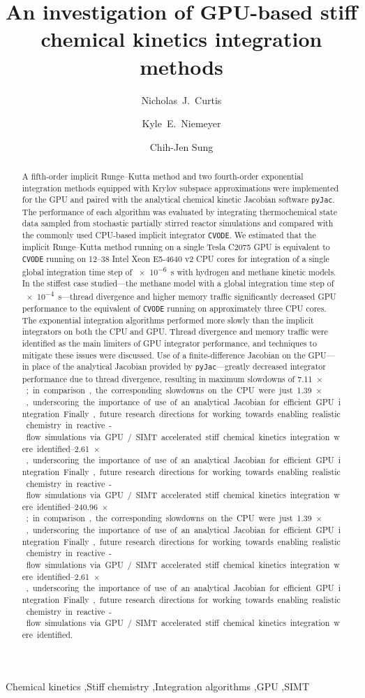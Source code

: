 \documentclass[preprint,review,11pt]{elsarticle}
\begin{document}
\begin{frontmatter}

\title{An investigation of GPU-based stiff chemical kinetics integration methods}

\author[uconn]{Nicholas~J.\ Curtis}
\author[osu]{Kyle~E.\ Niemeyer}
\author[uconn]{Chih-Jen Sung}

\address[uconn]{Department of Mechanical Engineering\\
  University of Connecticut, Storrs, CT 06269, USA}
\address[osu]{School of Mechanical, Industrial, and Manufacturing Engineering\\
  Oregon State University, Corvallis, OR 97331, USA}


\begin{abstract}
A fifth-order implicit Runge--Kutta method and two fourth-order exponential integration methods equipped with Krylov subspace approximations were implemented for the GPU and paired with the analytical chemical kinetic Jacobian software \texttt{pyJac}.
The performance of each algorithm was evaluated by integrating thermochemical state data sampled from stochastic partially stirred reactor simulations and compared with the commonly used CPU-based implicit integrator \texttt{CVODE}.
We estimated that the implicit Runge--Kutta method running on a single Tesla C2075 GPU is equivalent to \texttt{CVODE} running on \numrange{12}{38} Intel Xeon E5-4640 v2 CPU cores for integration of a single global integration time step of \SI{e-6}{\second} with hydrogen and methane kinetic models.
In the stiffest case studied---the methane model with a global integration time step of \SI{e-4}{\second}---thread divergence and higher memory traffic significantly decreased GPU performance to the equivalent of \texttt{CVODE} running on approximately three CPU cores.
The exponential integration algorithms performed more slowly than the implicit integrators on both the CPU and GPU.
Thread divergence and memory traffic were identified as the main limiters of GPU integrator performance, and techniques to mitigate these issues were discussed.
Use of a finite-difference Jacobian on the GPU---in place of the analytical Jacobian provided by \texttt{pyJac}---greatly decreased integrator performance due to thread divergence, resulting in maximum slowdowns of \SIrange{7.11}{240.96}{$\times$}; in comparison, the corresponding slowdowns on the CPU were just \SIrange{1.39}{2.61}{$\times$}, underscoring the importance of use of an analytical Jacobian for efficient GPU integration.
Finally, future research directions for working towards enabling realistic chemistry in reactive-flow simulations via GPU\slash SIMT accelerated stiff chemical kinetics integration were identified.
\end{abstract}

\begin{keyword}
 Chemical kinetics \sep Stiff chemistry \sep Integration algorithms \sep GPU \sep SIMT
\end{keyword}

\end{frontmatter}
\end{document}
